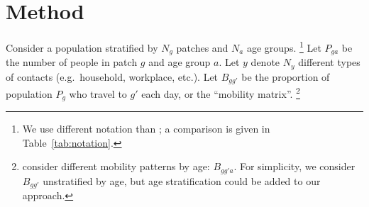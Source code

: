 \section{Method}\label{meth}
Consider a population stratified by $N_g$ patches and $N_a$ age groups.%
\footnote{We use different notation than \citet{Arenas2020};
  a comparison is given in Table~\ref{tab:notation}.}
Let $P_{ga}$ be the number of people in patch $g$ and age group $a$.
Let $y$ denote $N_y$ different types of contacts (e.g.\ household, workplace, etc.).
Let $B_{gg'}$ be the proportion of population $P_{g}$ who travel to $g'$ each day,
or the ``mobility matrix''.%
\footnote{\citet{Arenas2020} consider different mobility patterns by age: $B_{gg'a}$.
  For simplicity, we consider $B_{gg'}$ unstratified by age,
  but age stratification could be added to our approach.}
